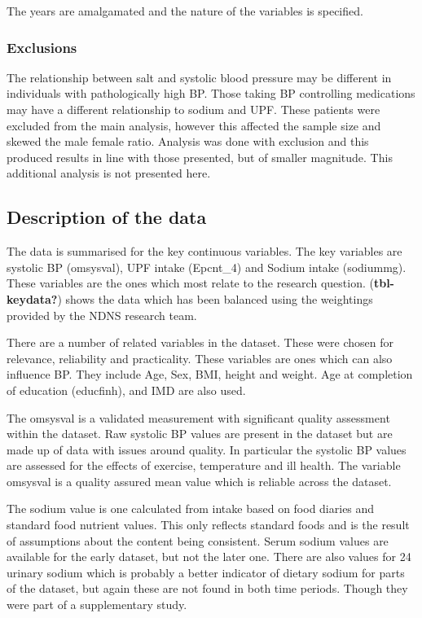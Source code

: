 \documentclass[
]{article}
\begin{document}
The years are amalgamated and the nature of the variables is specified.

\hypertarget{exclusions}{%
\subsubsection{Exclusions}\label{exclusions}}

The relationship between salt and systolic blood pressure may be
different in individuals with pathologically high BP. Those taking BP
controlling medications may have a different relationship to sodium and
UPF. These patients were excluded from the main analysis, however this
affected the sample size and skewed the male female ratio. Analysis was
done with exclusion and this produced results in line with those
presented, but of smaller magnitude. This additional analysis is not
presented here.

\hypertarget{description-of-the-data}{%
\subsection{Description of the data}\label{description-of-the-data}}

The data is summarised for the key continuous variables. The key
variables are systolic BP (omsysval), UPF intake (Epcnt\_4) and Sodium
intake (sodiummg). These variables are the ones which most relate to the
research question. (\textbf{tbl-keydata?}) shows the data which has been
balanced using the weightings provided by the NDNS research team.

There are a number of related variables in the dataset. These were
chosen for relevance, reliability and practicality. These variables are
ones which can also influence BP. They include Age, Sex, BMI, height and
weight. Age at completion of education (educfinh), and IMD are also
used.

The omsysval is a validated measurement with significant quality
assessment within the dataset. Raw systolic BP values are present in the
dataset but are made up of data with issues around quality. In
particular the systolic BP values are assessed for the effects of
exercise, temperature and ill health. The variable omsysval is a quality
assured mean value which is reliable across the dataset.

The sodium value is one calculated from intake based on food diaries and
standard food nutrient values. This only reflects standard foods and is
the result of assumptions about the content being consistent. Serum
sodium values are available for the early dataset, but not the later
one. There are also values for 24 urinary sodium which is probably a
better indicator of dietary sodium for parts of the dataset, but again
these are not found in both time periods. Though they were part of a
supplementary study.
\end{document}
